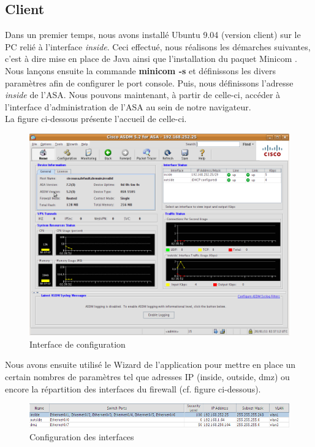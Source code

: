 \documentclass[a4paper,12pt]{article}
\begin{document}
\subsection{Client}
Dans un premier temps, nous avons installé Ubuntu 9.04 (version client) sur le PC relié à l'interface \textit{inside}. Ceci effectué, nous réalisons les démarches suivantes, c'est à dire mise en place de Java ainsi que l'installation du paquet \og Minicom \fg.\\
Nous lançons ensuite la commande \textbf{minicom -s} et définissons les divers paramètres afin de configurer le port console. Puis, nous définissons l'adresse \textit{inside} de l'ASA. Nous pouvons maintenant, à partir de celle-ci, accéder à l'interface d'administration de l'ASA au sein de notre navigateur.\\
La figure ci-dessous présente l'accueil de celle-ci. 

\begin{figure}[H]
	\center
	\includegraphics[width=15cm]{img/1-Interfaceconfigfw.png}
	\caption{Interface de configuration}
\end{figure}

Nous avons ensuite utilisé le \og Wizard \fg de l'application pour mettre en place un certain nombres de paramètres tel que adresses IP (inside, outside, dmz) ou encore la répartition des interfaces du firewall (cf. figure ci-dessous). 
\begin{figure}[H]
	\center
	\includegraphics[width=15cm]{img/2-Interfaces.png}
	\caption{Configuration des interfaces}
\end{figure}
\end{document}
